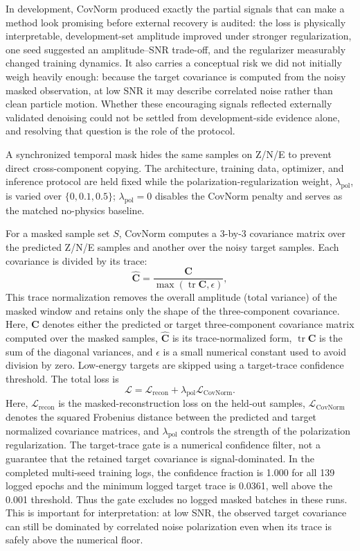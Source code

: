 \documentclass[review,12pt,authoryear]{elsarticle}
\newcommand{\lpol}{\lambda_{\mathrm{pol}}}
\begin{document}
In development, CovNorm produced exactly the partial signals that can make a method look promising before external recovery is audited: the loss is physically interpretable, development-set amplitude improved under stronger regularization, one seed suggested an amplitude--SNR trade-off, and the regularizer measurably changed training dynamics. It also carries a conceptual risk we did not initially weigh heavily enough: because the target covariance is computed from the noisy masked observation, at low SNR it may describe correlated noise rather than clean particle motion. Whether these encouraging signals reflected externally validated denoising could not be settled from development-side evidence alone, and resolving that question is the role of the protocol.

A synchronized temporal mask hides the same samples on Z/N/E to prevent direct cross-component copying. The architecture, training data, optimizer, and inference protocol are held fixed while the polarization-regularization weight, $\lpol$, is varied over $\{0,0.1,0.5\}$; $\lpol=0$ disables the CovNorm penalty and serves as the matched no-physics baseline.

For a masked sample set $S$, CovNorm computes a 3-by-3 covariance matrix over the predicted Z/N/E samples and another over the noisy target samples. Each covariance is divided by its trace:
\begin{equation}
\hat{\bm{C}} = \frac{\bm{C}}{\max(\operatorname{tr}\bm{C},\epsilon)} ,
\end{equation}
This trace normalization removes the overall amplitude (total variance) of the masked window and retains only the shape of the three-component covariance. Here, $\bm{C}$ denotes either the predicted or target three-component covariance matrix computed over the masked samples, $\hat{\bm{C}}$ is its trace-normalized form, $\operatorname{tr}\bm{C}$ is the sum of the diagonal variances, and $\epsilon$ is a small numerical constant used to avoid division by zero. Low-energy targets are skipped using a target-trace confidence threshold. The total loss is
\begin{equation}
\mathcal{L}=\mathcal{L}_{\mathrm{recon}}+\lpol\mathcal{L}_{\mathrm{CovNorm}}.
\end{equation}
Here, $\mathcal{L}_{\mathrm{recon}}$ is the masked-reconstruction loss on the held-out samples, $\mathcal{L}_{\mathrm{CovNorm}}$ denotes the squared Frobenius distance between the predicted and target normalized covariance matrices, and $\lpol$ controls the strength of the polarization regularization.
The target-trace gate is a numerical confidence filter, not a guarantee that the retained target covariance is signal-dominated. In the completed multi-seed training logs, the confidence fraction is 1.000 for all 139 logged epochs and the minimum logged target trace is 0.0361, well above the 0.001 threshold. Thus the gate excludes no logged masked batches in these runs. This is important for interpretation: at low SNR, the observed target covariance can still be dominated by correlated noise polarization even when its trace is safely above the numerical floor.
\end{document}

